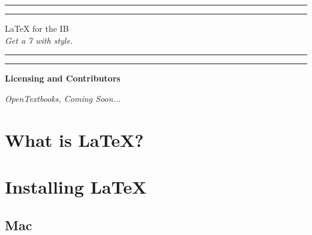 \documentclass[12pt,a4paper]{article}
\begin{document}

\begin{titlepage}
\centering %
\scshape %
\vfill

\rule{\textwidth}{1.6pt}\vspace*{-\baselineskip}\vspace*{2pt}
\rule{\textwidth}{0.4pt}

\vspace{1.5\baselineskip} %
\LARGE{LaTeX for the IB}\\
\vspace{0.2\baselineskip}
\small{\textit{Get a 7 with style.}}
\vspace{0.75\baselineskip} %

\rule{\textwidth}{0.4pt}\vspace*{-\baselineskip}\vspace{3.2pt}
\rule{\textwidth}{1.6pt}

\vfill
\end{titlepage}



\begin{center}
\Large{\textbf{Licensing and Contributors}}

\vfill
\small{\textit{OpenTextbooks, Coming Soon\texttrademark...}}
\vfill

\newpage
\end{center}

\begin{center}
\tableofcontents
\newpage
\end{center}

\section{What is LaTeX?}

\section{Installing LaTeX}

\subsection{Mac}
\end{document}
